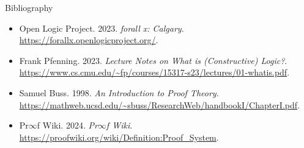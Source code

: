 \documentclass[aspectratio=169]{beamer}
\makeatletter
\newcommand{\urlc}[1]{\textcolor{sigma@mainblue}{\url{#1}}}
\makeatother
\begin{document}
\begin{frame}{Bibliography}
	\begin{itemize}
		\item Open Logic Project. 2023. \emph{forall x: Calgary}. \urlc{https://forallx.openlogicproject.org/}.
		\item Frank Pfenning. 2023. \emph{Lecture Notes on What is (Constructive) Logic?}. \urlc{https://www.cs.cmu.edu/~fp/courses/15317-s23/lectures/01-whatis.pdf}.
		\item Samuel Buss. 1998. \emph{An Introduction to Proof Theory}. \urlc{https://mathweb.ucsd.edu/~sbuss/ResearchWeb/handbookI/ChapterI.pdf}.
		\item Pr$\infty$f Wiki. 2024. \emph{Pr$\infty$f Wiki}. \urlc{https://proofwiki.org/wiki/Definition:Proof_System}.
	\end{itemize}
\end{frame}
\end{document}
